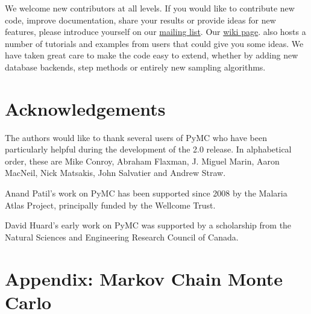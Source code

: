 \documentclass[letterpaper,10pt,english]{sphinxmanual}
\begin{document}
We welcome new contributors at all levels. If you would like to contribute new code, improve documentation, share your results or provide ideas for new features, please introduce yourself on our \href{mailto:pymc@googlegroups.com}{mailing list}. Our \href{https://github.com/pymc-devs/pymc/wiki}{wiki page}. also hosts a number of tutorials and examples from users that could give you some ideas. We have taken great care to make the code easy to extend, whether by adding new database backends, step methods or entirely new sampling algorithms.


\chapter{Acknowledgements}
\label{conclusion:wiki-page}\label{conclusion:acknowledgements}
The authors would like to thank several users of PyMC who have been particularly helpful during the development of the 2.0 release. In alphabetical order, these are Mike Conroy, Abraham Flaxman, J. Miguel Marin, Aaron MacNeil, Nick Matsakis, John Salvatier and Andrew Straw.

Anand Patil’s work on PyMC has been supported since 2008 by the Malaria Atlas Project, principally funded by the Wellcome Trust.

David Huard’s early work on PyMC was supported by a scholarship from the Natural Sciences and Engineering Research Council of Canada.


\chapter{Appendix: Markov Chain Monte Carlo}
\label{theory::doc}\label{theory:chap-mcmc}\label{theory:appendix-markov-chain-monte-carlo}
\end{document}
